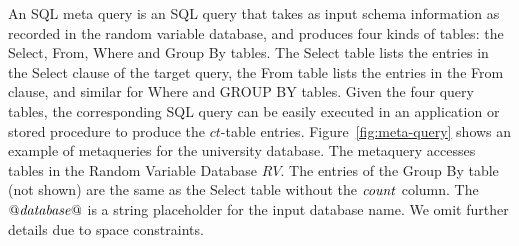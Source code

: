 \documentclass{vldb}
\newcommand{\ct}{\mathit{ct}}
\begin{document}
%
%
%
An SQL meta query is an SQL query that takes as input schema information as recorded in the random variable database,
and produces four kinds of tables: the Select, From, Where and Group By tables. The Select table lists the entries in the Select clause of the target query, the From table lists the entries in the From clause, and similar for Where and GROUP BY tables. %
Given the four query tables, the corresponding SQL query can be easily executed in an application or stored procedure to produce the $\ct$-table entries.
Figure~\ref{fig:meta-query} shows an example of metaqueries for the university database. The metaquery accesses tables in the Random Variable Database $RV$. The entries of the Group By table (not shown) are the same as the Select table without the $\it{count}$ column.
The $\it{@database@}$ is a string placeholder for the input database name. We omit further details due to space constraints.
\end{document}
